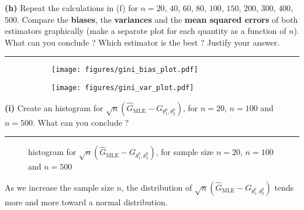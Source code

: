 \documentclass[10pt, a4paper, nofootinbib]{scrartcl}
\begin{document}
\textbf{(h)} Repeat the calculations in (f) for $n = 20$, $40$, $60$, $80$, $100$, $150$, $200$, $300$, $400$, $500$. Compare the \textbf{biases}, the \textbf{variances} and the \textbf{mean squared errors} of both estimators graphically (make a separate plot for each quantity as a function of $n$). What can you conclude ? Which estimator is the best ? Justify your answer.

\begin{center}\rule{6cm}{0.4pt}\end{center}

\begin{figure}
  \centering
  \begin{subfigure}{.4\textwidth}
    \centering
    \texttt{[image: figures/gini\_bias\_plot.pdf]}
    \caption{}
    \label{<label>}
  \end{subfigure}
  \begin{subfigure}{.4\textwidth}
    \centering
    \texttt{[image: figures/gini\_var\_plot.pdf]}
    \caption{}
    \label{<label>}
  \end{subfigure}

  \medskip 

  \begin{subfigure}{.4\textwidth}
    \centering
    \vspace{0pt}
    
    \caption{}
    \label{<label>}
  \end{subfigure}
\end{figure}


\textbf{(i)} Create an histogram for $\sqrt{n}(\hat{G}_{\text{MLE}} - G_{\theta_1^0, \theta_2^0})$, for $n = 20$, $n = 100$ and $n = 500$. What can you conclude ?

\begin{center}\rule{6cm}{0.4pt}\end{center}

\begin{figure}[H]
  \centering
  
  \caption{histogram for $\sqrt{n}(\hat{G}_{\text{MLE}} - G_{\theta_1^0, \theta_2^0})$, for sample size $n = 20$, $n = 100$ and $n = 500$}
  \label{fig:special-formula-sample-size-comparison}
\end{figure}

As we increase the sample size $n$, the distribution of $\sqrt{n}(\hat{G}_{\text{MLE}} - G_{\theta_1^0, \theta_2^0})$ tends more and more toward a normal distribution.
\end{document}
